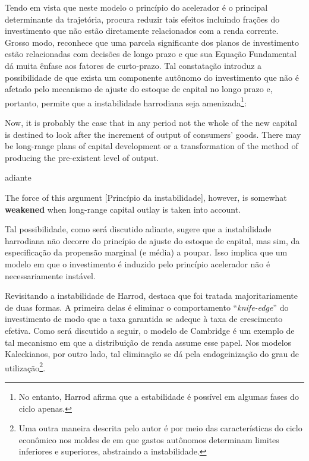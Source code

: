 
Tendo em vista que neste modelo o princípio do acelerador é o principal determinante da trajetória, \textcite[p.~26--28]{harrod_essay_1939} procura reduzir tais efeitos incluindo frações do investimento que não estão diretamente relacionados com a renda corrente. Grosso modo,  reconhece que uma parcela significante dos planos de investimento estão relacionadas com decisões de longo prazo e que sua Equação Fundamental dá muita ênfase aos fatores de curto-prazo. Tal constatação introduz a possibilidade de que exista um componente autônomo do investimento que não é afetado pelo mecanismo de ajuste do estoque de capital no longo prazo e, portanto, permite que a instabilidade harrodiana seja amenizada\footnote{No entanto, Harrod afirma que a estabilidade é possível em algumas fases do ciclo apenas.}:

\begin{citacao}
Now, it is probably the case that in any period not the whole of the new capital is destined to look after the increment of output of consumers' goods. There may be  long-range plans of capital development or a transformation  of the method of  producing  the pre-existent level of output. \cite[p.~17]{harrod_essay_1939}
\end{citacao}
adiante
\begin{citacao}
The force  of this  argument [Princípio da instabilidade], however, is somewhat \textbf{weakened} when long-range  capital outlay is taken into account.
\cite[p.~26, grifos adicionados]{harrod_essay_1939}
\end{citacao}
Tal possibilidade, como será discutido adiante, sugere que a instabilidade harrodiana não decorre do princípio de ajuste do estoque de capital, mas sim, da especificação da propensão marginal (e média) a poupar. Isso implica que um modelo em que o investimento é induzido pelo princípio acelerador não é necessariamente instável.

Revisitando a instabilidade de Harrod, \textcite{allain_macroeconomic_2014} destaca que foi tratada majoritariamente de duas formas. A primeira delas é eliminar o comportamento  ``\textit{knife-edge}'' do investimento de modo que a taxa garantida se adeque à taxa de crescimento efetiva. Como será discutido a seguir, o modelo de Cambridge é um exemplo de tal mecanismo em que a distribuição de renda assume esse papel. Nos modelos Kaleckianos, por outro lado, tal eliminação  se dá pela endogeinização do grau de utilização\footnote{Uma outra maneira descrita pelo autor é por meio das características do ciclo econômico nos moldes de \textcite{hicks_contribution_1972} em que gastos autônomos determinam limites inferiores e superiores, abstraindo a instabilidade.}. 



